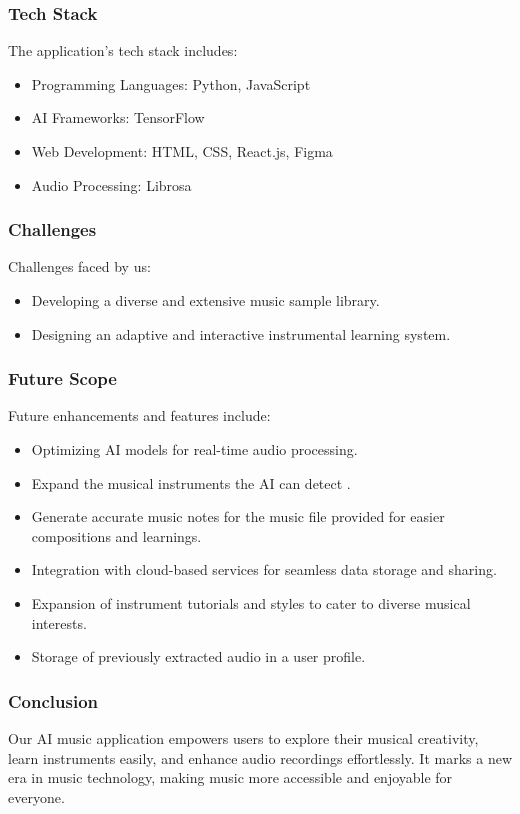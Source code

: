 \documentclass{beamer}
\begin{document}
\begin{frame}
  \frametitle{Tech Stack}
  The application's tech stack includes:
  \begin{itemize}
    \item Programming Languages: Python, JavaScript
    \item AI Frameworks: TensorFlow
    \item Web Development: HTML, CSS, React.js, Figma
    \item Audio Processing: Librosa
  \end{itemize}
\end{frame}


\begin{frame}
  \frametitle{Challenges}
  Challenges faced by us:
  \begin{itemize}
    \item Developing a diverse and extensive music sample library.
    \item Designing an adaptive and interactive instrumental learning system.
  \end{itemize}
\end{frame}

\begin{frame}
  \frametitle{Future Scope}
  Future enhancements and features include:
  \begin{itemize}
    \item Optimizing AI models for real-time audio processing.
    \item Expand the musical instruments the AI can detect .
    \item Generate accurate music notes for the music file provided for easier 
compositions and learnings.
    \item Integration with cloud-based services for seamless data storage and 
sharing.
    \item Expansion of instrument tutorials and styles to cater to diverse 
musical interests.
\item Storage of previously extracted audio in a user profile.
  \end{itemize}
\end{frame}

\begin{frame}
  \frametitle{Conclusion}
  Our AI music application empowers users to explore their musical creativity, 
learn instruments easily, and enhance audio recordings effortlessly. It marks 
a new era in music technology, making music more accessible and enjoyable for 
everyone.
\end{frame}

\end{document}
